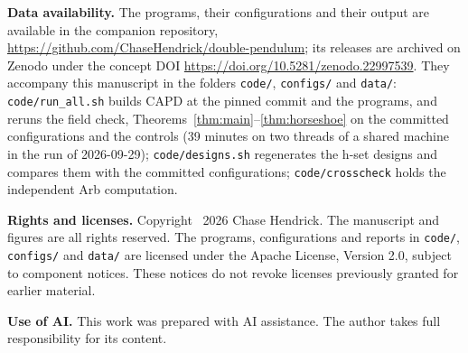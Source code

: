\documentclass[11pt]{article}
\theoremstyle{definition}
\begin{document}
{\raggedright\noindent\textbf{Data availability.} The programs, their configurations and their output are available in the companion repository, \url{https://github.com/ChaseHendrick/double-pendulum}; its releases are archived on Zenodo under the concept DOI \url{https://doi.org/10.5281/zenodo.22997539}. They accompany this manuscript in the folders \texttt{code/}, \texttt{configs/} and \texttt{data/}: \texttt{code/run\_all.sh} builds CAPD at the pinned commit and the programs, and reruns the field check, Theorems~\ref{thm:main}--\ref{thm:horseshoe} on the committed configurations and the controls (39 minutes on two threads of a shared machine in the run of 2026-09-29); \texttt{code/designs.sh} regenerates the h-set designs and compares them with the committed configurations; \texttt{code/crosscheck} holds the independent Arb computation.\par}

\medskip
\noindent\textbf{Rights and licenses.} Copyright \textcopyright\ 2026 Chase Hendrick. The manuscript and figures are all rights reserved. The programs, configurations and reports in \texttt{code/}, \texttt{configs/} and \texttt{data/} are licensed under the Apache License, Version 2.0, subject to component notices. These notices do not revoke licenses previously granted for earlier material.

\noindent\textbf{Use of AI.} This work was prepared with AI assistance. The author takes full responsibility for its content.
\end{document}
